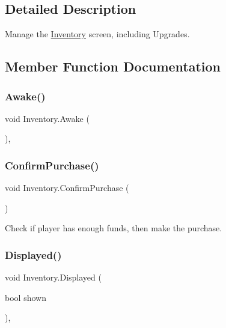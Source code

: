 \subsection{Detailed Description}
Manage the \mbox{\hyperlink{class_inventory}{Inventory}} screen, including Upgrades. 

\subsection{Member Function Documentation}
\mbox{\label{class_inventory_a88da279faf84d529af011f7e25bea01b}} 
\subsubsection{\texorpdfstring{Awake()}{Awake()}}
{\footnotesize\ttfamily void Inventory.\+Awake (\begin{DoxyParamCaption}{ }\end{DoxyParamCaption})\hspace{0.3cm}{\ttfamily [inline]}, {\ttfamily [private]}}

\mbox{\label{class_inventory_a284995426324c648b4c9144a3b9bc277}} 
\subsubsection{\texorpdfstring{ConfirmPurchase()}{ConfirmPurchase()}}
{\footnotesize\ttfamily void Inventory.\+Confirm\+Purchase (\begin{DoxyParamCaption}{ }\end{DoxyParamCaption})\hspace{0.3cm}{\ttfamily [inline]}}



Check if player has enough funds, then make the purchase. 

\mbox{\label{class_inventory_a6a6906197f22590ffa086d4aca935dc3}} 
\subsubsection{\texorpdfstring{Displayed()}{Displayed()}}
{\footnotesize\ttfamily void Inventory.\+Displayed (\begin{DoxyParamCaption}\item[{bool}]{shown }\end{DoxyParamCaption})\hspace{0.3cm}{\ttfamily [inline]}, {\ttfamily [private]}}




